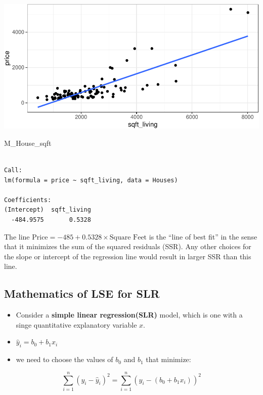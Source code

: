 \documentclass[
  letterpaper,
  DIV=11,
  numbers=noendperiod]{scrreprt}
\newenvironment{Shaded}{\begin{snugshade}}{\end{snugshade}}
\newcommand{\NormalTok}[1]{\textcolor[rgb]{0.00,0.23,0.31}{#1}}
\begin{document}
\includegraphics{Ch2_files/figure-pdf/unnamed-chunk-52-1.pdf}

\begin{Shaded}
\begin{Highlighting}[]
\NormalTok{M\_House\_sqft}
\end{Highlighting}
\end{Shaded}

\begin{verbatim}

Call:
lm(formula = price ~ sqft_living, data = Houses)

Coefficients:
(Intercept)  sqft_living  
  -484.9575       0.5328  
\end{verbatim}

The line \(\text{Price} = -485 + 0.5328 \times \text{Square Feet}\) is
the ``line of best fit'' in the sense that it minimizes the sum of the
squared residuals (SSR). Any other choices for the slope or intercept of
the regression line would result in larger SSR than this line.

\subsection{Mathematics of LSE for
SLR}\label{mathematics-of-lse-for-slr}

\begin{itemize}
\item
  Consider a \textbf{simple linear regression(SLR)} model, which is one
  with a singe quantitative explanatory variable \(x\).
\item
  \(\hat{y}_i = b_0+b_1x_i\)
\item
  we need to choose the values of \(b_0\) and \(b_1\) that minimize:
\end{itemize}

\[
\displaystyle\sum_{i=1}^n(y_i-\hat{y}_i)^2 =\displaystyle\sum_{i=1}^n(y_i-(b_0+b_1x_i))^2
\]
\end{document}
